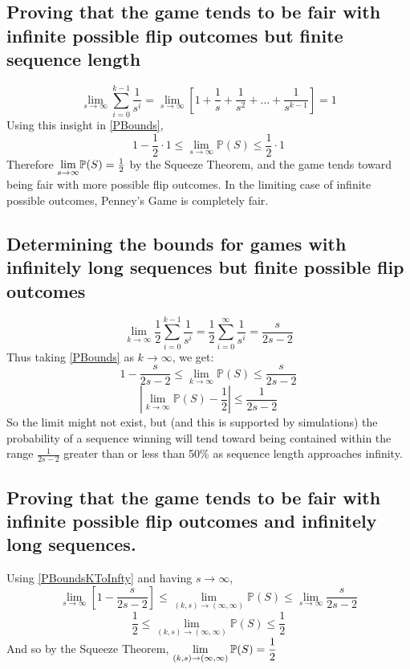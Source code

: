 \documentclass[english,12pt,a4paper,final]{article}
\begin{document}
\subsection{Proving that the game tends to be fair with infinite possible flip outcomes but finite sequence length}

\begin{equation*}
	\lim_{s \rightarrow \infty}\sum_{i=0}^{k-1}\frac{1}{s^i} = \lim_{s \rightarrow \infty} \left[1 + \frac{1}{s} + \frac{1}{s^2} + \dots + \frac{1}{s^{k-1}}\right] = 1
\end{equation*}
Using this insight in \eqref{PBounds},
\begin{equation*}
	1-\frac{1}{2}\cdot1 \le \lim_{s\rightarrow\infty}\mathbb{P}(S) \le \frac{1}{2}\cdot1
\end{equation*}
Therefore $\mathlarger{\lim_{s\rightarrow\infty}}\mathbb{P}(S) = \frac{1}{2}$ by the Squeeze Theorem, and the game tends toward being fair with more possible flip outcomes. In the limiting case of infinite possible outcomes, Penney's Game is completely fair.

\subsection{Determining the bounds for games with infinitely long sequences but finite possible flip outcomes}
\begin{equation*}
	\lim_{k\rightarrow\infty}\frac{1}{2}\sum_{i=0}^{k-1}\frac{1}{s^i} = \frac{1}{2}\sum_{i=0}^{\infty}\frac{1}{s^i} = \frac{s}{2s-2}
\end{equation*}
Thus taking \eqref{PBounds} as $k\rightarrow\infty$, we get:
\begin{equation}\label{PBoundsKToInfty}
	1-\frac{s}{2s-2} \le \lim_{k\rightarrow\infty} \mathbb{P}(S) \le \frac{s}{2s-2} 
\end{equation}
\begin{equation*}
	\left|\lim_{k\rightarrow\infty}\mathbb{P}(S) - \frac{1}{2}\right| \le \frac{1}{2s-2}
\end{equation*}
So the limit might not exist, but (and this is supported by simulations) the probability of a sequence winning will tend toward being contained within the range $\frac{1}{2s-2}$ greater than or less than 50\% as sequence length approaches infinity.

\subsection{Proving that the game tends to be fair with infinite possible flip outcomes and infinitely long sequences.}
Using \eqref{PBoundsKToInfty} and having $s\rightarrow\infty$,
\begin{equation*}
	\lim_{s\rightarrow\infty}\left[1-\frac{s}{2s-2}\right] \le \lim_{(k, s)\rightarrow(\infty, \infty)} \mathbb{P}(S) \le \lim_{s\rightarrow\infty}\frac{s}{2s-2} 
\end{equation*}
\begin{equation*}
	\frac{1}{2} \le \lim_{(k, s)\rightarrow(\infty, \infty)} \mathbb{P}(S) \le \frac{1}{2}
\end{equation*}
And so by the Squeeze Theorem, $\mathlarger{\lim_{(k, s)\rightarrow(\infty, \infty)} \mathbb{P}(S) = \frac{1}{2}}$
\end{document}
